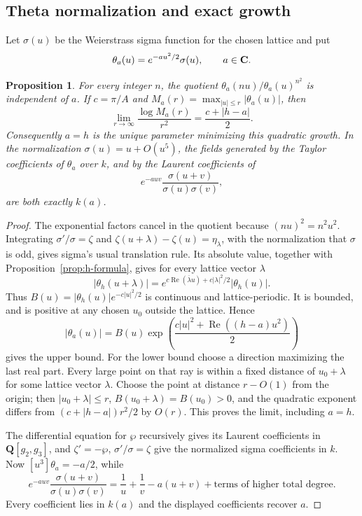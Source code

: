 \documentclass[11pt]{article}
\newtheorem{proposition}[theorem]{Proposition}
\theoremstyle{definition}\newtheorem{definition}[theorem]{Definition}
\theoremstyle{remark}\newtheorem{remark}[theorem]{Remark}
\newcommand{\Q}{\mathbf Q}\newcommand{\Z}{\mathbf Z}
\begin{document}
\subsection{Theta normalization and exact growth}
Let $\sigma(u)$ be the Weierstrass sigma function for the chosen lattice and put
\[
          \theta_a(u)=e^{-au^2/2}\sigma(u),\qquad a\in\mathbf C.
\]
\begin{proposition}\label{prop:theta-growth}
For every integer $n$, the quotient $\theta_a(nu)/\theta_a(u)^{n^2}$ is independent of $a$. If $c=\pi/A$ and $M_a(r)=\max_{|u|\le r}|\theta_a(u)|$, then
\[
             \lim_{r\to\infty}\frac{\log M_a(r)}{r^2}
                    =\frac{c+|h-a|}{2}.
\]
Consequently $a=h$ is the unique parameter minimizing this quadratic growth. In the normalization $\sigma(u)=u+O(u^5)$, the fields generated by the Taylor coefficients of $\theta_a$ over $k$, and by the Laurent coefficients of
\[
        e^{-auv}\frac{\sigma(u+v)}{\sigma(u)\sigma(v)},
\]
are both exactly $k(a)$.
\end{proposition}
\begin{proof}
The exponential factors cancel in the quotient because $(nu)^2=n^2u^2$. Integrating $\sigma'/\sigma=\zeta$ and $\zeta(u+\lambda)-\zeta(u)=\eta_\lambda$, with the normalization that $\sigma$ is odd, gives sigma's usual translation rule. Its absolute value, together with Proposition~\ref{prop:h-formula}, gives for every lattice vector $\lambda$
\[
 |\theta_h(u+\lambda)|
   =e^{c\operatorname{Re}(\overline\lambda u)+c|\lambda|^2/2}
       |\theta_h(u)|.
\]
Thus $B(u)=|\theta_h(u)|e^{-c|u|^2/2}$ is continuous and lattice-periodic. It is bounded, and is positive at any chosen $u_0$ outside the lattice. Hence
\[
 |\theta_a(u)|=B(u)\exp\!\left(\frac{c|u|^2+\operatorname{Re}((h-a)u^2)}2\right)
\]
gives the upper bound. For the lower bound choose a direction maximizing the last real part. Every large point on that ray is within a fixed distance of $u_0+\lambda$ for some lattice vector $\lambda$. Choose the point at distance $r-O(1)$ from the origin; then $|u_0+\lambda|\le r$, $B(u_0+\lambda)=B(u_0)>0$, and the quadratic exponent differs from $(c+|h-a|)r^2/2$ by $O(r)$. This proves the limit, including $a=h$.

The differential equation for $\wp$ recursively gives its Laurent coefficients in $\Q[g_2,g_3]$, and $\zeta'=-\wp$, $\sigma'/\sigma=\zeta$ give the normalized sigma coefficients in $k$. Now $[u^3]\theta_a=-a/2$, while
\[
 e^{-auv}\frac{\sigma(u+v)}{\sigma(u)\sigma(v)}
       =\frac1u+\frac1v-a(u+v)+\text{terms of higher total degree}.
\]
Every coefficient lies in $k(a)$ and the displayed coefficients recover $a$.
\end{proof}
\end{document}
